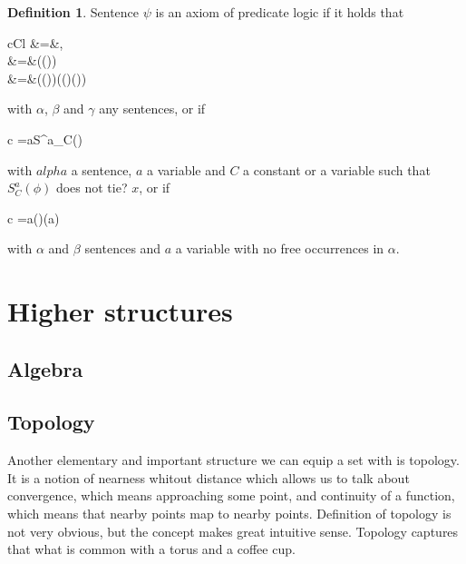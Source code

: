 \documentclass[11pt,oneside,%
]{memoir}
\newenvironment{eqna}{\begin{IEEEeqnarray}{c}}{\end{IEEEeqnarray}\ignorespacesafterend}
\newenvironment{eqnb}{\begin{IEEEeqnarray}{cCl}}{\end{IEEEeqnarray}\ignorespacesafterend}
\theoremstyle{definition}
\newtheorem{maaritelma}{Definition}
\begin{document}
\begin{maaritelma}
Sentence \(\psi\) is an axiom of predicate logic if it holds that
\begin{eqnb}
    \psi&=&\neg\neg\alpha\rightarrow\alpha,\nonumber\\
    \psi&=&(\alpha\rightarrow(\beta\rightarrow\alpha))\quad{}\nonumber\\
    \psi&=&(\alpha\rightarrow(\beta\rightarrow\gamma))\rightarrow((\alpha\rightarrow\beta)\rightarrow(\alpha\rightarrow\gamma))\nonumber
\end{eqnb}
with \(\alpha\), \(\beta\) and \(\gamma\) any sentences, or if
\begin{eqna}
    \psi=\forall a\;\phi\rightarrow S^a_C(\phi)
\end{eqna}
with \(alpha\) a sentence, \(a\) a variable and \(C\) a constant or a variable such that \(S^a_C(\phi)\) does not tie? \(x\), or if
\begin{eqna}
    \psi=\forall a(\alpha\rightarrow\beta)\rightarrow(\alpha\rightarrow\forall a\beta)
\end{eqna}
with \(\alpha\) and \(\beta\) sentences and \(a\) a variable with no free occurrences in \(\alpha\).
\end{maaritelma}







\chapter{Higher structures}

\section{Algebra}

\section{Topology}

Another elementary and important structure we can equip a set with is topology. It is a notion of nearness whitout distance which allows us to talk about convergence, which means approaching some point, and continuity of a function, which means that nearby points map to nearby points. Definition of topology is not very obvious, but the concept makes great intuitive sense. Topology captures that what is common with a torus and a coffee cup.
\end{document}
